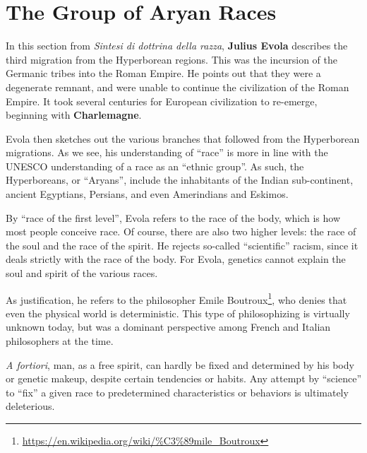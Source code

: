 \section{The Group of Aryan Races}

\begin{quotationx}
In this section from \emph{Sintesi di dottrina della razza}, \textbf{Julius Evola} describes the third migration from the Hyperborean regions. This was the incursion of the Germanic tribes into the Roman Empire. He points out that they were a degenerate remnant, and were unable to continue the civilization of the Roman Empire. It took several centuries for European civilization to re-emerge, beginning with \textbf{Charlemagne}.

Evola then sketches out the various branches that followed from the Hyperborean migrations. As we see, his understanding of ``race'' is more in line with the UNESCO understanding of a race as an ``ethnic group''. As such, the Hyperboreans, or ``Aryans'', include the inhabitants of the Indian sub-continent, ancient Egyptians, Persians, and even Amerindians and Eskimos.

By ``race of the first level'', Evola refers to the race of the body, which is how most people conceive race. Of course, there are also two higher levels: the race of the soul and the race of the spirit. He rejects so-called ``scientific'' racism, since it deals strictly with the race of the body. For Evola, genetics cannot explain the soul and spirit of the various races.

As justification, he refers to the philosopher Emile Boutroux\footnote{\url{https://en.wikipedia.org/wiki/\%C3\%89mile_Boutroux}}, who denies that even the physical world is deterministic. This type of philosophizing is virtually unknown today, but was a dominant perspective among French and Italian philosophers at the time.

\emph{A fortiori}, man, as a free spirit, can hardly be fixed and determined by his body or genetic makeup, despite certain tendencies or habits. Any attempt by ``science'' to ``fix'' a given race to predetermined characteristics or behaviors is ultimately deleterious.
\end{quotationx}


